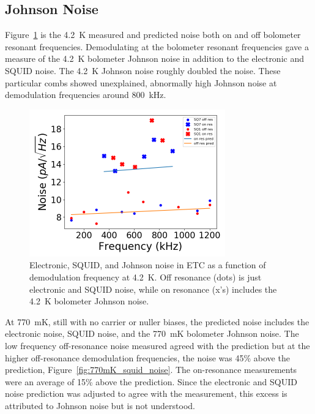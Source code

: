 \subsection{Johnson Noise}
\label{sec:johnson_noise}


Figure~\ref{fig:johnson_and_squid_noise} is the 4.2~K measured and predicted noise both on and off bolometer resonant frequencies. 
Demodulating at the bolometer resonant frequencies gave a measure of the 4.2~K bolometer Johnson noise in addition to the electronic and \ac{SQUID} noise. 
The 4.2~K Johnson noise roughly doubled the noise.
These particular combs showed unexplained, abnormally high Johnson noise at demodulation frequencies around 800~kHz. 

\begin{figure}[ht!]
\begin{center}
\includegraphics[height=2.5in]{figures/squid_plus_electronic_noise.png}
\caption{Electronic, \ac{SQUID}, and Johnson noise in \ac{ETC} as a function of demodulation frequency at 4.2~K. Off resonance (dots) is just electronic and \ac{SQUID} noise, while on resonance (x's) includes the 4.2~K bolometer Johnson noise. 
\label{fig:johnson_and_squid_noise} }
\end{center}
\end{figure}

At 770~mK, still with no carrier or nuller biases, the predicted noise includes the electronic noise, \ac{SQUID} noise, and the 770~mK bolometer Johnson noise. 
The low frequency off-resonance noise measured agreed with the prediction but at the higher off-resonance demodulation frequencies, the noise was 45\% above the prediction, Figure~\ref{fig:770mK_squid_noise}. 
The on-resonance measurements were an average of 15\% above the prediction. 
Since the electronic and \ac{SQUID} noise prediction was adjusted to agree with the measurement, this excess is attributed to Johnson noise but is not understood. 

